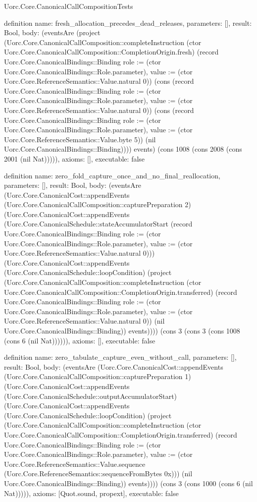 \begin{lexlean}{Uorc.Core.CanonicalCallCompositionTests}
\begin{semanticmodule}
definition{
  name: fresh_allocation_precedes_dead_releases,
  parameters: [],
  result: Bool,
  body: (eventsAre (project (Uorc.Core.CanonicalCallComposition::completeInstruction (ctor Uorc.Core.CanonicalCallComposition::CompletionOrigin.fresh) (record Uorc.Core.CanonicalBindings::Binding {role := (ctor Uorc.Core.CanonicalBindings::Role.parameter), value := (ctor Uorc.Core.ReferenceSemantics::Value.natural 0)}) (cons (record Uorc.Core.CanonicalBindings::Binding {role := (ctor Uorc.Core.CanonicalBindings::Role.parameter), value := (ctor Uorc.Core.ReferenceSemantics::Value.natural 0)}) (cons (record Uorc.Core.CanonicalBindings::Binding {role := (ctor Uorc.Core.CanonicalBindings::Role.parameter), value := (ctor Uorc.Core.ReferenceSemantics::Value.byte 5)}) (nil Uorc.Core.CanonicalBindings::Binding)))) events) (cons 1008 (cons 2008 (cons 2001 (nil Nat))))),
  axioms: [],
  executable: false
}

definition{
  name: zero_fold_capture_once_and_no_final_reallocation,
  parameters: [],
  result: Bool,
  body: (eventsAre (Uorc.Core.CanonicalCost::appendEvents (Uorc.Core.CanonicalCallComposition::capturePreparation 2) (Uorc.Core.CanonicalCost::appendEvents (Uorc.Core.CanonicalSchedule::stateAccumulatorStart (record Uorc.Core.CanonicalBindings::Binding {role := (ctor Uorc.Core.CanonicalBindings::Role.parameter), value := (ctor Uorc.Core.ReferenceSemantics::Value.natural 0)})) (Uorc.Core.CanonicalCost::appendEvents (Uorc.Core.CanonicalSchedule::loopCondition) (project (Uorc.Core.CanonicalCallComposition::completeInstruction (ctor Uorc.Core.CanonicalCallComposition::CompletionOrigin.transferred) (record Uorc.Core.CanonicalBindings::Binding {role := (ctor Uorc.Core.CanonicalBindings::Role.parameter), value := (ctor Uorc.Core.ReferenceSemantics::Value.natural 0)}) (nil Uorc.Core.CanonicalBindings::Binding)) events)))) (cons 3 (cons 3 (cons 1008 (cons 6 (nil Nat)))))),
  axioms: [],
  executable: false
}

definition{
  name: zero_tabulate_capture_even_without_call,
  parameters: [],
  result: Bool,
  body: (eventsAre (Uorc.Core.CanonicalCost::appendEvents (Uorc.Core.CanonicalCallComposition::capturePreparation 1) (Uorc.Core.CanonicalCost::appendEvents (Uorc.Core.CanonicalSchedule::outputAccumulatorStart) (Uorc.Core.CanonicalCost::appendEvents (Uorc.Core.CanonicalSchedule::loopCondition) (project (Uorc.Core.CanonicalCallComposition::completeInstruction (ctor Uorc.Core.CanonicalCallComposition::CompletionOrigin.transferred) (record Uorc.Core.CanonicalBindings::Binding {role := (ctor Uorc.Core.CanonicalBindings::Role.parameter), value := (ctor Uorc.Core.ReferenceSemantics::Value.sequence (Uorc.Core.ReferenceSemantics::sequenceFromBytes 0x))}) (nil Uorc.Core.CanonicalBindings::Binding)) events)))) (cons 3 (cons 1000 (cons 6 (nil Nat))))),
  axioms: [Quot.sound, propext],
  executable: false
}


\end{semanticmodule}
\end{lexlean}
